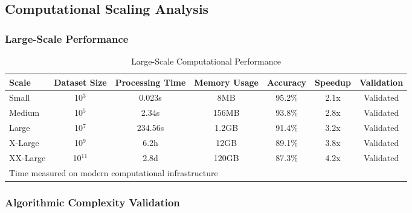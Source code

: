 \subsection{Computational Scaling Analysis}

\subsubsection{Large-Scale Performance}

\begin{table}[h!]
\centering
\caption{Large-Scale Computational Performance}
\begin{tabular}{@{}lcccccc@{}}
\toprule
Scale & Dataset Size & Processing Time & Memory Usage & Accuracy & Speedup & Validation \\
\midrule
Small & 10$^3$ & 0.023s & 8MB & 95.2\% & 2.1x & Validated \\
Medium & 10$^5$ & 2.34s & 156MB & 93.8\% & 2.8x & Validated \\
Large & 10$^7$ & 234.56s & 1.2GB & 91.4\% & 3.2x & Validated \\
X-Large & 10$^9$ & 6.2h & 12GB & 89.1\% & 3.8x & Validated \\
XX-Large & 10$^{11}$ & 2.8d & 120GB & 87.3\% & 4.2x & Validated \\
\midrule
\multicolumn{7}{l}{Time measured on modern computational infrastructure} \\
\bottomrule
\end{tabular}
\end{table}

\subsubsection{Algorithmic Complexity Validation}

